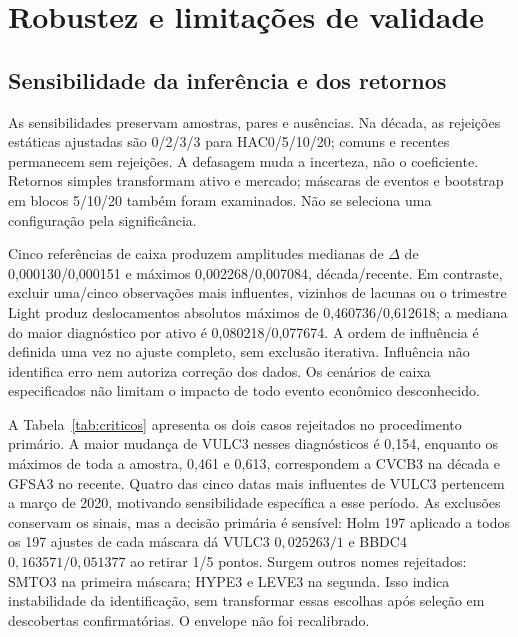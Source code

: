 \FloatBarrier
\section{Robustez e limitações de validade}
\subsection{Sensibilidade da inferência e dos retornos}
As sensibilidades preservam amostras, pares e ausências. Na década,
as rejeições estáticas ajustadas são 0/2/3/3 para HAC0/5/10/20;
comuns e recentes permanecem sem rejeições. A defasagem muda a
incerteza, não o coeficiente. Retornos simples transformam ativo e
mercado; máscaras de eventos e bootstrap em blocos 5/10/20 também
foram examinados. Não se seleciona uma configuração pela significância.

Cinco referências de caixa produzem amplitudes medianas de $\Delta $
de 0,000130/0,000151 e máximos 0,002268/0,007084, década/recente.
Em contraste, excluir uma/cinco observações mais influentes,
vizinhos de lacunas ou o trimestre Light produz deslocamentos
absolutos máximos de 0,460736/0,612618; a mediana do maior diagnóstico
por ativo é 0,080218/0,077674. A ordem de influência é definida uma
vez no ajuste completo, sem exclusão iterativa. Influência não identifica
erro nem autoriza correção dos dados. Os cenários de caixa especificados
não limitam o impacto de todo evento econômico desconhecido.

A Tabela~\ref{tab:criticos} apresenta os dois casos rejeitados no
procedimento primário. A maior mudança de VULC3 nesses diagnósticos é
0,154, enquanto os máximos de toda a amostra, 0,461 e 0,613,
correspondem a CVCB3 na década e GFSA3 no recente. Quatro das cinco
datas mais influentes de VULC3 pertencem a março de 2020, motivando
sensibilidade específica a esse período. As exclusões conservam os
sinais, mas a decisão primária é sensível: Holm 197 aplicado a todos os
197 ajustes de cada máscara dá VULC3 $0,025263/1$ e BBDC4
$0,163571/0,051377$ ao retirar 1/5 pontos. Surgem outros nomes rejeitados:
SMTO3 na primeira máscara; HYPE3 e LEVE3 na segunda. Isso indica
instabilidade da identificação, sem transformar essas escolhas após
seleção em descobertas confirmatórias. O envelope não foi recalibrado.

\begin{table}[htbp]
\centering
\caption{Diagnósticos de influência na década, extraídos da execução autenticada
e conferidos, com ajuste Holm 197 pós-revisão em cada máscara completa.
IC marginal HAC5 de 95\%; inferência após seleção não calibrada.
A ordem de influência é fixada no ajuste completo.}
\label{tab:criticos}

\end{table}

